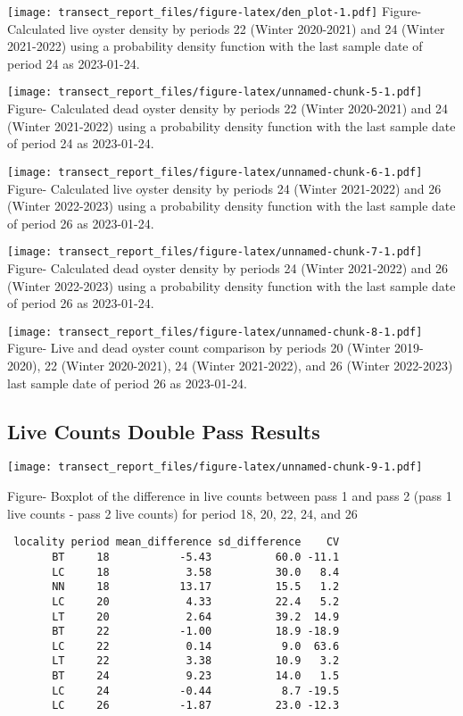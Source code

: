 \documentclass[
]{article}
\begin{document}
\texttt{[image: transect\_report\_files/figure-latex/den\_plot-1.pdf]}
Figure- Calculated live oyster density by periods 22 (Winter 2020-2021)
and 24 (Winter 2021-2022) using a probability density function with the
last sample date of period 24 as 2023-01-24. \newpage

\texttt{[image: transect\_report\_files/figure-latex/unnamed-chunk-5-1.pdf]}
Figure- Calculated dead oyster density by periods 22 (Winter 2020-2021)
and 24 (Winter 2021-2022) using a probability density function with the
last sample date of period 24 as 2023-01-24. \newpage

\texttt{[image: transect\_report\_files/figure-latex/unnamed-chunk-6-1.pdf]}
Figure- Calculated live oyster density by periods 24 (Winter 2021-2022)
and 26 (Winter 2022-2023) using a probability density function with the
last sample date of period 26 as 2023-01-24. \newpage

\texttt{[image: transect\_report\_files/figure-latex/unnamed-chunk-7-1.pdf]}
Figure- Calculated dead oyster density by periods 24 (Winter 2021-2022)
and 26 (Winter 2022-2023) using a probability density function with the
last sample date of period 26 as 2023-01-24. \newpage

\texttt{[image: transect\_report\_files/figure-latex/unnamed-chunk-8-1.pdf]}
Figure- Live and dead oyster count comparison by periods 20 (Winter
2019-2020), 22 (Winter 2020-2021), 24 (Winter 2021-2022), and 26 (Winter
2022-2023) last sample date of period 26 as 2023-01-24. \newpage

\hypertarget{live-counts-double-pass-results}{%
\subsection{Live Counts Double Pass
Results}\label{live-counts-double-pass-results}}

\texttt{[image: transect\_report\_files/figure-latex/unnamed-chunk-9-1.pdf]}

Figure- Boxplot of the difference in live counts between pass 1 and pass
2 (pass 1 live counts - pass 2 live counts) for period 18, 20, 22, 24,
and 26

\begin{verbatim}
 locality period mean_difference sd_difference    CV
       BT     18           -5.43          60.0 -11.1
       LC     18            3.58          30.0   8.4
       NN     18           13.17          15.5   1.2
       LC     20            4.33          22.4   5.2
       LT     20            2.64          39.2  14.9
       BT     22           -1.00          18.9 -18.9
       LC     22            0.14           9.0  63.6
       LT     22            3.38          10.9   3.2
       BT     24            9.23          14.0   1.5
       LC     24           -0.44           8.7 -19.5
       LC     26           -1.87          23.0 -12.3
\end{verbatim}
\end{document}
